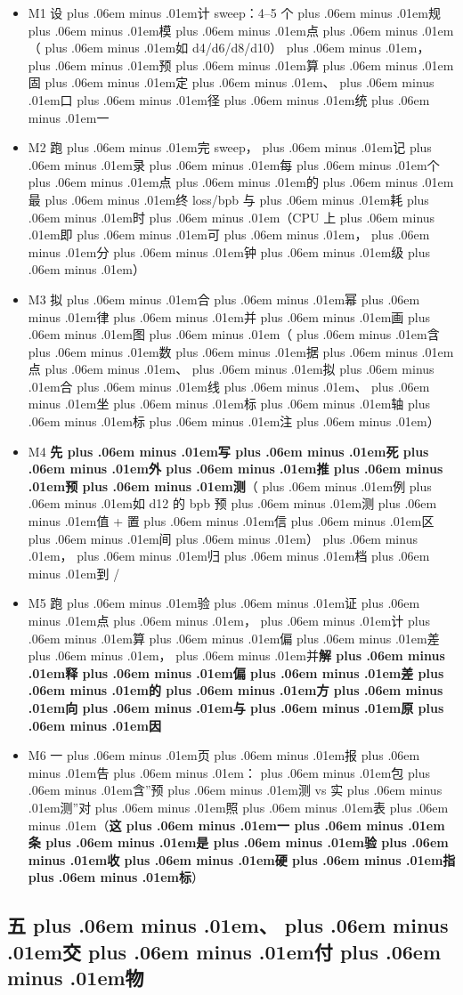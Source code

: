 \documentclass[
]{article}
\newcommand{\passthrough}[1]{#1}
\providecommand{\tightlist}{%
  \setlength{\itemsep}{0pt}\setlength{\parskip}{0pt}}
\def\zh#1{{\zhfont #1}}
\def\codezh#1{{\zhmonofont #1}}
\def\zhglue{\hskip0pt plus .06em minus .01em}
\begin{document}
\begin{itemize}
\tightlist
\item[$\square$]
  M1 \zh{设\zhglue 计} sweep\zh{：}4--5 \zh{个\zhglue 规\zhglue 模\zhglue 点\zhglue （\zhglue 如} d4/d6/d8/d10\zh{）\zhglue ，\zhglue 预\zhglue 算\zhglue 固\zhglue 定\zhglue 、\zhglue 口\zhglue 径\zhglue 统\zhglue 一}
\item[$\square$]
  M2 \zh{跑\zhglue 完} sweep\zh{，\zhglue 记\zhglue 录\zhglue 每\zhglue 个\zhglue 点\zhglue 的\zhglue 最\zhglue 终} loss/bpb \zh{与\zhglue 耗\zhglue 时\zhglue （}CPU \zh{上\zhglue 即\zhglue 可\zhglue ，\zhglue 分\zhglue 钟\zhglue 级\zhglue ）}
\item[$\square$]
  M3 \zh{拟\zhglue 合\zhglue 幂\zhglue 律\zhglue 并\zhglue 画\zhglue 图\zhglue （\zhglue 含\zhglue 数\zhglue 据\zhglue 点\zhglue 、\zhglue 拟\zhglue 合\zhglue 线\zhglue 、\zhglue 坐\zhglue 标\zhglue 轴\zhglue 标\zhglue 注\zhglue ）}
\item[$\square$]
  M4 \textbf{\zh{先\zhglue 写\zhglue 死\zhglue 外\zhglue 推\zhglue 预\zhglue 测}}\zh{（\zhglue 例\zhglue 如} d12 \zh{的} bpb \zh{预\zhglue 测\zhglue 值} + \zh{置\zhglue 信\zhglue 区\zhglue 间\zhglue ）\zhglue ，\zhglue 归\zhglue 档\zhglue 到} \passthrough{\codezh{{\zh{证}}{\zh{据}}/}}
\item[$\square$]
  M5 \zh{跑\zhglue 验\zhglue 证\zhglue 点\zhglue ，\zhglue 计\zhglue 算\zhglue 偏\zhglue 差\zhglue ，\zhglue 并}\textbf{\zh{解\zhglue 释\zhglue 偏\zhglue 差\zhglue 的\zhglue 方\zhglue 向\zhglue 与\zhglue 原\zhglue 因}}
\item[$\square$]
  M6 \zh{一\zhglue 页\zhglue 报\zhglue 告\zhglue ：\zhglue 包\zhglue 含}''\zh{预\zhglue 测} vs \zh{实\zhglue 测}''\zh{对\zhglue 照\zhglue 表\zhglue （}\textbf{\zh{这\zhglue 一\zhglue 条\zhglue 是\zhglue 验\zhglue 收\zhglue 硬\zhglue 指\zhglue 标}}\zh{）}
\end{itemize}

\subsection{\zh{五\zhglue 、\zhglue 交\zhglue 付\zhglue 物}}\label{ux4e94ux4ea4ux4ed8ux7269}
\end{document}
